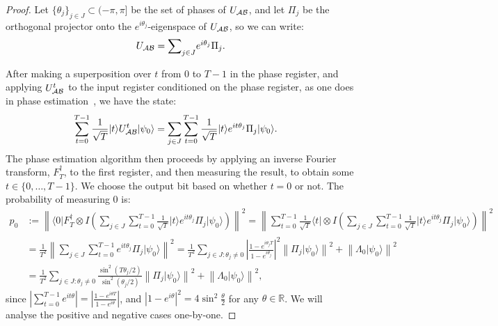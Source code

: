\documentclass{article}
\def\ket#1{{\lvert}#1\rangle}
\def\bra#1{{\langle}#1\rvert}
\renewcommand{\>}{\rangle}
\newcommand{\<}{\langle}
\renewcommand{\(}{\left(}
\renewcommand{\)}{\right)}
\def\abs#1{\left| #1 \right|}
\def\norm#1{\left\| #1 \right\|}
\begin{document}
\begin{proof}
Let $\{\theta_j\}_{j\in J}\subset (-\pi,\pi]$ be the set of phases of $U_{\cal AB}$, and let $\Pi_j$ be the orthogonal projector onto the $e^{i\theta_j}$-eigenspace of $U_{\cal AB}$, so we can write:
\begin{equation*}
U_{\cal AB} = \textstyle{\displaystyle\sum}_{j\in J} e^{i\theta_j}\Pi_j.
\end{equation*}

After making a superposition over $t$ from $0$ to $T-1$ in the phase register, and applying $U_{\cal AB}^t$ to the input register conditioned on the phase register,  as one does in phase estimation~\cite{kitaev1996PhaseEst}, we have the state:
\begin{equation*}
\begin{split}
\sum_{t=0}^{T-1}\frac{1}{\sqrt{T}}\ket{t}U_{\cal AB}^t\ket{\psi_0} &=  \sum_{j\in J}\sum_{t=0}^{T-1}\frac{1}{\sqrt{T}}\ket{t}e^{it\theta_j}\Pi_j\ket{\psi_0}.
\end{split}
\end{equation*}
The phase estimation algorithm then proceeds by applying an inverse Fourier transform, $F_T^\dagger$, to the first register, and then measuring the result, to obtain some $t\in \{0,\dots,T-1\}$. We choose the output bit based on whether $t=0$ or not. The probability of measuring 0 is:
\begin{equation}
\begin{split}
p_0&:=  \norm{\bra{0}F_T^\dagger \otimes I\left( \sum_{j\in J} \sum_{t=0}^{T-1}\frac{1}{\sqrt{T}}\ket{t}e^{it\theta_j}\Pi_j\ket{\psi_0} \right)}^2 
= \norm{\sum_{t=0}^{T-1}\frac{1}{\sqrt{T}}\bra{t}\otimes I \left( \sum_{j\in J} \sum_{t=0}^{T-1}\frac{1}{\sqrt{T}}\ket{t}e^{it\theta_j}\Pi_j\ket{\psi_0} \right)}^2\\
&= \frac{1}{T^2}\norm{\sum_{j\in J}\sum_{t=0}^{T-1}e^{it\theta_j}\Pi_j\ket{\psi_0}}^2
= \frac{1}{T^2}\sum_{j\in J:\theta_j\neq 0}\left| \frac{1-e^{i\theta_j T}}{1-e^{i\theta_j}} \right|^2 \norm{\Pi_j\ket{\psi_0}}^2 + \norm{\Lambda_0\ket{\psi_0}}^2\\
&=\frac{1}{T^2}\sum_{j\in J:\theta_j\neq 0}\frac{\sin^2(T\theta_j/2)}{\sin^2(\theta_j/2)}\norm{\Pi_j\ket{\psi_0}}^2+\norm{\Lambda_0\ket{\psi_0}}^2,
\end{split}\label{eq:phase-prob}
\end{equation}
since $\abs{\sum_{t=0}^{T-1}e^{i t\theta}} = \abs{\frac{1-e^{i\theta T}}{1-e^{i\theta}}}$,
and $|1-e^{i\theta}|^2=4\sin^2\frac{\theta}{2}$ for any $\theta\in\mathbb{R}$.
We will analyse the positive and negative cases one-by-one. 


\end{proof}
\end{document}
